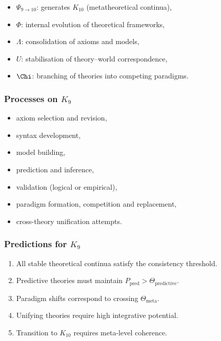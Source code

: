 \begin{itemize}
    \item $\Psi_{9\to10}$: generates $K_{10}$ (metatheoretical continua),
    \item $\Phi$: internal evolution of theoretical frameworks,
    \item $\Lambda$: consolidation of axioms and models,
    \item $U$: stabilisation of theory–world correspondence,
    \item $\Chi$: branching of theories into competing paradigms.
\end{itemize}

\subsubsection{Processes on \texorpdfstring{$K_9$}{K_9}}

\begin{itemize}
    \item axiom selection and revision,
    \item syntax development,
    \item model building,
    \item prediction and inference,
    \item validation (logical or empirical),
    \item paradigm formation, competition and replacement,
    \item cross-theory unification attempts.
\end{itemize}

\subsubsection{Predictions for \texorpdfstring{$K_9$}{K_9}}

\begin{enumerate}
    \item All stable theoretical continua satisfy the consistency threshold.
    \item Predictive theories must maintain $P_{\mathrm{pred}} > \Theta_{\mathrm{predictive}}$.
    \item Paradigm shifts correspond to crossing $\Theta_{\mathrm{meta}}$.
    \item Unifying theories require high integrative potential.
    \item Transition to $K_{10}$ requires meta-level coherence.
\end{enumerate}

